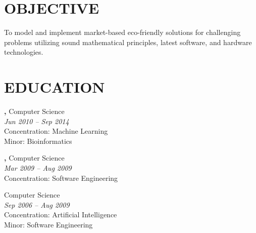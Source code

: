 \documentclass[margin, 10pt]{res} %
\begin{document}
\begin{resume}

 
\section{OBJECTIVE}  

To model and implement market-based eco-friendly solutions for challenging problems utilizing sound mathematical principles, latest software, and hardware technologies.



\section{EDUCATION}

{\bf \color{Black}{Doctor of Philosophy},} Computer Science \\
{} \hfill \textit{Jun 2010 -- Sep 2014} \\
Concentration: Machine Learning \\
Minor: Bioinformatics 

{\bf \color{Black}{Exchange Student},} Computer Science \\
{\color{RubineRed}{University of Limerick, Ireland}} \hfill \textit{Mar 2009 -- Aug 2009} \\
Concentration: Software Engineering 

{\bf \color{Black}{Master of Science,}} Computer Science \\
{\color{RubineRed}{Lahore University of Management Sciences (LUMS), Pakistan}} \hfill \textit{Sep 2006 -- Aug 2009} \\
Concentration: Artificial Intelligence \\
Minor: Software Engineering


\end{resume}
\end{document}
